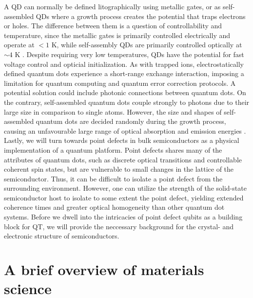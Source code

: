 A QD can normally be defined litographically using metallic gates, or as self-assembled QDs where a growth process creates the potential that traps electrons or holes. The difference between them is a question of controllability and temperature, since the metallic gates is primarily controlled electrically and operate at $<1$ K, while self-assembly QDs are primarily controlled optically at $\sim 4$ K \cite{Ladd2010}. Despite requiring very low temperatures, QDs have the potential for fast voltage control and opticial initialization. As with trapped ions, electrostatically defined quantum dots experience a short-range exchange interaction, imposing a limitation for quantum computing and quantum error correction protocols. A potential solution could include photonic connections between quantum dots. On the contrary, self-assembled quantum dots couple strongly to photons due to their large size in comparison to single atoms. However, the size and shapes of self-assembled quantum dots are decided randomly during the growth process, causing an unfavourable large range of optical absorption and emission energies \cite{Ladd2010}. \\




Lastly, we will turn towards point defects in bulk semiconductors as a physical implementation of a quantum platform. Point defects shares many of the attributes of quantum dots, such as discrete optical transitions and controllable coherent spin states, but are vulnerable to small changes in the lattice of the semiconductor. Thus, it can be difficult to isolate a point defect from the surrounding environment. However, one can utilize the strength of the solid-state semiconductor host to isolate to some extent the point defect, yielding extended coherence times and greater optical homogeneity than other quantum dot systems. Before we dwell into the intricacies of point defect qubits as a building block for QT, we will provide the neccessary background for the crystal- and electronic structure of semiconductors.   %

\section{A brief overview of materials science}

